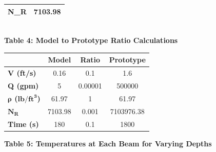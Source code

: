 \documentclass{article}
\begin{document}
\begin{center}
\begin{tabular}{|l|r|}
    \textbf{N\_R}              & 7103.98 \\\hline
\end{tabular}
\vspace{5mm}
{\bf {\large \\Table 4: Model to Prototype Ratio Calculations\\}}
\vspace{3mm}
\begin{tabular}{|l|ccc|}
    \hline
    ~                & \textbf{Model}      & \textbf{Ratio}   & \textbf{Prototype} \\\hline
    \textbf{V (ft/s)}         & 0.16 & 0.1     & 1.6                         \\
    \textbf{Q (gpm)}          & 5          & 0.00001 & 500000                         \\
    \textbf{$\bm{\rho}$ ($\bm{\textbf{lb}/\textbf{ft}^3}$)} & 61.97 & 1       & 61.97   \\
    $\bm{N_R}$          & 7103.98 & 0.001   & 7103976.38                  \\
    \textbf{Time (s)} &180 &0.1 &1800\\\hline
\end{tabular}
\newpage 

{\bf {\large Table 5: Temperatures at Each Beam for Varying Depths\\}}


\end{center}
\end{document}

